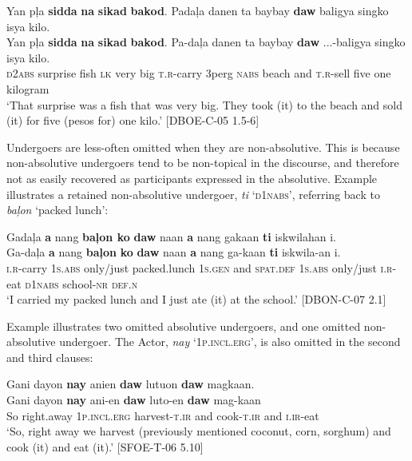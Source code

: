 \ea
\label{ex:onekilo}
Yan pļa \textbf{sidda} \textbf{na} \textbf{sikad} \textbf{bakod}. Padaļa danen ta baybay \textbf{daw} baligya singko isya kilo.\\\smallskip
\gll Yan pļa \textbf{sidda} \textbf{na} \textbf{sikad} \textbf{bakod}. Pa-daļa danen ta baybay \textbf{daw} ...-baligya singko isya kilo. \\
\textsc{d2abs} surprise fish \textsc{lk} very big \textsc{t.r}-carry 3p{erg} \textsc{nabs} beach and \textsc{t.r}-sell five one kilogram \\
\glt ‘That surprise was a fish that was very big. They took (it) to the beach and sold (it) for five (pesos for) one kilo.’ [DBOE-C-05 1.5-6]
\z

Undergoers are less-often omitted when they are non-absolutive. This is because non-absolutive undergoers tend to be non-topical in the discourse, and therefore not as easily recovered as participants expressed in the absolutive. Example  illustrates a retained non-absolutive undergoer, \textit{ti} `\textsc{d1nabs}', referring back to  \textit{baļon} `packed lunch':

\ea
\label{ex:attheschool}
Gadaļa \textbf{a} nang \textbf{baļon ko} \textbf{daw} naan \textbf{a} nang gakaan \textbf{ti} iskwilahan i.\\\smallskip
\gll Ga-daļa \textbf{a} nang \textbf{baļon} \textbf{ko} \textbf{daw} naan \textbf{a} nang ga-kaan \textbf{ti} iskwila-an i. \\
\textsc{i.r}-carry 1\textsc{s.abs} only/just packed.lunch 1\textsc{s.gen} and \textsc{spat.def} 1\textsc{s.abs} only/just \textsc{i.r}-eat \textsc{d1nabs} school-\textsc{nr} \textsc{def.n}\\
\glt ‘I carried my packed lunch and I just ate (it) at the school.’ [DBON-C-07 2.1]
\z

Example  illustrates two omitted absolutive undergoers, and one omitted non-absolutive undergoer. The Actor, \textit{nay} `1\textsc{p.incl.erg}', is also omitted in the second and third clauses:

\ea
\label{ex:andateit}
Gani	dayon		\textbf{nay} anien 			\textbf{daw} lutuon		\textbf{daw}	magkaan. \smallskip\\
\gll Gani	dayon		\textbf{nay} ani-en			\textbf{daw} luto-en	\textbf{daw}	mag-kaan\\
So 	right.away	1\textsc{p.incl.erg} harvest-\textsc{t.ir} 	and cook-\textsc{t.ir} 		 and	\textsc{i.ir}-eat \\
\glt `So, right away we harvest (previously mentioned coconut, corn, sorghum) and cook (it) and eat (it).' [SFOE-T-06 5.10]
\z

